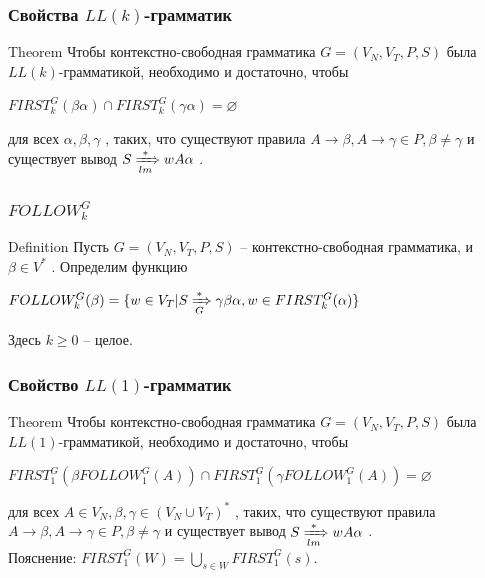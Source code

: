 \documentclass{beamer}
\begin{document}
\begin{frame}
	\transwipe[direction=90]
	\frametitle{Свойства $LL(k)$-грамматик}
	\begin{block}{Theorem}
		Чтобы контекстно-свободная грамматика $G = (V_N , V_T , P , S )$ была $LL(k )$-грамматикой, необходимо и достаточно, чтобы
		\begin{center}
            $FIRST_k^G (\beta \alpha) \cap FIRST_k^G (\gamma \alpha) = \varnothing$
        \end{center}

для всех $\alpha, \beta , \gamma$ , таких, что существуют правила $A \rightarrow \beta , A \rightarrow \gamma \in P, \beta \neq \gamma$ и существует вывод $S \xRightarrow[lm]{*} wA\alpha$ .
	\end{block}
\end{frame}

\begin{frame}
	\transwipe[direction=90]
	\frametitle{$FOLLOW_k^G$}
	\begin{block}{Definition}
		Пусть $G = (V_N , V_T , P , S )$ -- контекстно-свободная грамматика, и $\beta \in V^{*}$ . Определим функцию 
		\begin{center}
		    $FOLLOW_k^G (\beta ) = \{w \in V_T |S \xRightarrow[G]{*} \gamma \beta \alpha, w \in FIRST_k^G (\alpha)\}$
	    \end{center}
	    Здесь $k \geq 0$ -- целое.
	\end{block}
\end{frame}

\begin{frame}
	\transwipe[direction=90]
	\frametitle{Свойство $LL(1)$-грамматик}
	\begin{block}{Theorem}
		Чтобы контекстно-свободная грамматика $G = (V_N , V_T , P , S )$ была $LL(1)$-грамматикой, необходимо и достаточно, чтобы
        \begin{center}
            $FIRST_1^G (\beta FOLLOW_1^G (A)) \cap FIRST_1^G (\gamma FOLLOW_1^G (A)) = \varnothing$
        \end{center}
        для всех $A \in V_N , \beta , \gamma \in (V_N \cup V_T )^{*}$ , таких, что существуют правила $A \rightarrow \beta , A \rightarrow \gamma \in P, \beta \neq \gamma$ и существует вывод $S \xRightarrow[lm]{*} wA\alpha$ .\\
        Пояснение: $FIRST_1^G (W) =\bigcup_{ s \in W} FIRST_1^G (s)$.
	\end{block}
\end{frame}
\end{document}
